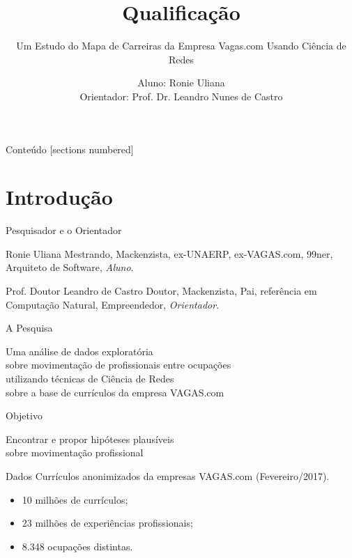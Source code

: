 \documentclass[10pt, hyperref={pdfpagelabels=false}]{beamer}
\title{Qualificação}
\subtitle{Um Estudo do Mapa de Carreiras da Empresa Vagas.com Usando Ciência de Redes}
\date{}
\author{Aluno: Ronie Uliana \\ Orientador: Prof. Dr. Leandro Nunes de Castro}
\institute{Universidade Presbiteriana Mackenzie}
\begin{document}
\maketitle

\begin{frame}{Conteúdo}
  [sections numbered]
  \tableofcontents[hideallsubsections]
\end{frame}

\section{Introdução}

\begin{frame}[fragile, label=pessoas]{Pesquisador e o Orientador}

  \begin{alertblock}{Ronie Uliana}
    Mestrando, Mackenzista, ex-UNAERP, ex-VAGAS.com, 99ner, Arquiteto de Software, \textit{Aluno}.
  \end{alertblock}
  
  \begin{alertblock}{Prof. Doutor Leandro de Castro}
    Doutor, Mackenzista, Pai, referência em Computação Natural, Empreendedor, \textit{Orientador}.
  \end{alertblock}
\end{frame}

\begin{frame}[fragile, label=pesquisa]{A Pesquisa}
  \begin{center}
    Uma \alert{análise de dados exploratória}\\
    sobre movimentação de profissionais entre ocupações\\
    utilizando técnicas de \alert{Ciência de Redes}\\
    sobre a base de currículos da empresa VAGAS.com
  \end{center}
\end{frame}

\begin{frame}[fragile, label=objetivo]{Objetivo}
  \begin{center}
    Encontrar e propor \alert{hipóteses} plausíveis\\
    sobre movimentação profissional
  \end{center}
\end{frame}

\begin{frame}[fragile, label=dados]{Dados}
  Currículos anonimizados da empresas VAGAS.com (Fevereiro/2017).
  
  \begin{itemize}
    \item 10 milhões de currículos;\\
    \item 23 milhões de experiências profissionais;\\
    \item 8.348 ocupações distintas.
  \end{itemize}
\end{frame}
\end{document}
